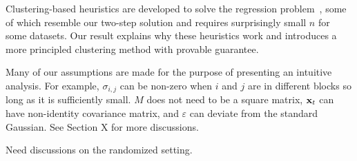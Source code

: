 Clustering-based heuristics are developed to solve the regression problem~\cite{ari2002clustered,jacob2009clustered,stock2011dynamic,huang2012learning,buhlmann2013correlated,witten2014cluster,cameron2015practitioner,delattre2016mixtures,bulteel2016clustering,seki2018regression,yamada2016localized}, some of which resemble our two-step solution and requires surprisingly small $n$ for some datasets. Our result explains why these heuristics work and 
introduces a more principled clustering method with provable guarantee. 

   







 
 
 Many of our assumptions are made  for the purpose of presenting an intuitive analysis. For example, $\sigma_{i,j}$ can be non-zero when $i$ and $j$ are in different blocks so long as it is sufficiently small. $M$ does not need to be a square matrix, $\mathbf{x}_t$ can have non-identity covariance matrix, and $\varepsilon$ can deviate from the standard Gaussian. 
{\color{red} See Section X for more discussions.}

{\color{blue} Need discussions on the randomized setting.}
